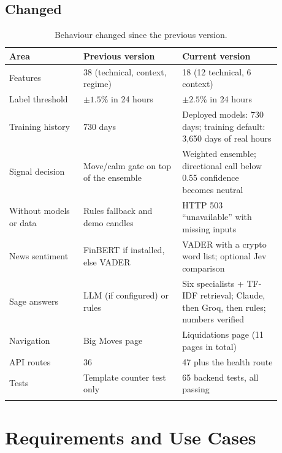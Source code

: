 \subsection{Changed}
{\renewcommand{\arraystretch}{1.3}
\begin{longtable}{|p{0.24\linewidth}|p{0.32\linewidth}|p{0.32\linewidth}|}
\hline\textbf{Area} & \textbf{Previous version} & \textbf{Current version}\\\hline\endhead
Features & 38 (technical, context, regime) & 18 (12 technical, 6 context)\\\hline
Label threshold & $\pm1.5\%$ in 24 hours & $\pm2.5\%$ in 24 hours\\\hline
Training history & 730 days & Deployed models: 730 days; training default: 3{,}650 days of real hours\\\hline
Signal decision & Move/calm gate on top of the ensemble & Weighted ensemble; directional call below 0.55 confidence becomes neutral\\\hline
Without models or data & Rules fallback and demo candles & HTTP 503 ``unavailable'' with missing inputs\\\hline
News sentiment & FinBERT if installed, else VADER & VADER with a crypto word list; optional Jev comparison\\\hline
Sage answers & LLM (if configured) or rules & Six specialists + TF-IDF retrieval; Claude, then Groq, then rules; numbers verified\\\hline
Navigation & Big Moves page & Liquidations page (11 pages in total)\\\hline
API routes & 36 & 47 plus the health route\\\hline
Tests & Template counter test only & 65 backend tests, all passing\\\hline
\caption{Behaviour changed since the previous version.}\label{tab:changed}
\end{longtable}}

\section{Requirements and Use Cases}
